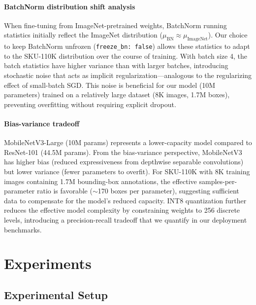 \documentclass[conference]{IEEEtran}
\begin{document}
\paragraph{BatchNorm distribution shift analysis}
When fine-tuning from ImageNet-pretrained weights, BatchNorm running
statistics initially reflect the ImageNet distribution
($\mu_{\text{BN}} \approx \mu_{\text{ImageNet}}$). Our choice to
keep BatchNorm unfrozen (\texttt{freeze\_bn: false}) allows these
statistics to adapt to the SKU-110K distribution over the course
of training. With batch size 4, the batch statistics have higher
variance than with larger batches, introducing stochastic noise
that acts as implicit regularization---analogous to the regularizing
effect of small-batch SGD. This noise is beneficial for our model
(10M parameters) trained on a relatively large dataset (8K images,
1.7M boxes), preventing overfitting without requiring explicit
dropout.

\paragraph{Bias-variance tradeoff}
MobileNetV3-Large (10M params) represents a lower-capacity model
compared to ResNet-101 (44.5M params). From the bias-variance
perspective, MobileNetV3 has higher bias (reduced expressiveness
from depthwise separable convolutions) but lower variance (fewer
parameters to overfit). For SKU-110K with 8K training images
containing 1.7M bounding-box annotations, the effective
samples-per-parameter ratio is favorable ($\sim$170 boxes per parameter),
suggesting sufficient data to compensate for the model's reduced
capacity. INT8 quantization further reduces the effective model
complexity by constraining weights to 256 discrete levels, introducing
a precision-recall tradeoff that we quantify in our deployment
benchmarks.

\section{Experiments}
\label{sec:experiments}

\subsection{Experimental Setup}
\label{sec:setup}
\end{document}
